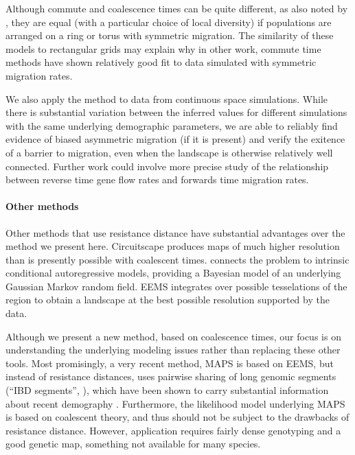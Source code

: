 \documentclass{article}
\begin{document}
Although commute and coalescence times can be quite different,
as also noted by \citet{mcrae2006isolation}, 
they are equal (with a particular choice of local diversity)
if populations are arranged on a ring or torus
with symmetric migration.
The similarity of these models to rectangular grids
may explain why in other work, commute time methods have shown relatively good fit to data
simulated with symmetric migration rates.

We also apply the method to data from continuous space simulations. 
While there is substantial variation between the inferred values 
for different simulations with the same underlying demographic parameters, 
we are able to reliably find evidence of biased asymmetric migration (if it is present)
and verify the exitence of a barrier to migration, 
even when the landscape is otherwise relatively well connected.
Further work could involve more precise study of the relationship
between reverse time gene flow rates and forwards time migration rates.

\paragraph{Other methods}
Other methods that use resistance distance have substantial advantages over the method we present here.
Circuitscape \citep{mcrae2008using} produces maps of much higher resolution 
than is presently possible with coalescent times.
\citet{hanks2013circuit} connects the problem to intrinsic conditional autoregressive models, 
providing a Bayesian model of an underlying Gaussian Markov random field.
EEMS \citep{petkova2014visualizing} integrates over possible tesselations of the region
to obtain a landscape at the best possible resolution supported by the data.

Although we present a new method, based on coalescence times,
our focus is on understanding the underlying modeling issues
rather than replacing these other tools.
Most promisingly, a very recent method, MAPS \citep{alasadi2018estimating}
is based on EEMS, but instead of resistance distances,
uses pairwise sharing of long genomic segments (``IBD segments'', \citet{browning2013improving}),
which have been shown to carry substantial information about recent demography
\citep{ralph2013geography,palamara2013inference,browning2015accurate}.
Furthermore, the likelihood model underlying MAPS is based on coalescent theory,
and thus should not be subject to the drawbacks of resistance distance.
However, application requires fairly dense genotyping and a good genetic map,
something not available for many species.
\end{document}
